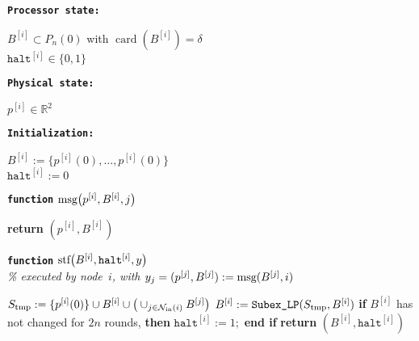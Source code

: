 \documentclass[onecolumn,journal,letterpaper]{IEEEtran}
\newcommand{\real}{{\mathbb{R}}}
\newcommand{\subscr}[2]{{#1}_{\textup{#2}}}
\newcommand{\union}{\cup}
\newcommand{\card}{\ensuremath{\operatorname{card}}}
\newcommand{\subexLP}{\textup{\texttt{SUBEX\_lp}}}
\renewcommand{\subexLP}{\textup{\texttt{Subex\_LP}}}
\newcommand{\innbrs}{\subscr{\mathcal{N}}{in}}
\newcommand{\supind}[2]{{#1}^{[#2]}}
\newcommand{\msg}{\textup{msg}}
\newcommand{\stf}{\textup{stf}}
\begin{document}
\noindent\begin{minipage}{0.44\linewidth}\textbf{\texttt{Processor
      state:}}\end{minipage}\begin{minipage}[t]{0.56\linewidth}
  $\supind{B}{i} \subset P_n(0)$ with $\card(\supind{B}{i})=\delta$\\$\supind{\texttt{halt}}{i}\in\{0,1\}$
\end{minipage}

\noindent\begin{minipage}{0.44\linewidth}\textbf{\texttt{Physical
      state:}}\end{minipage}\begin{minipage}[t]{0.56\linewidth}
  $\supind{p}{i} \in \real^2$
\end{minipage}

\smallskip
\noindent\begin{minipage}{0.44\linewidth}\textbf{\texttt{Initialization:}}\end{minipage}\begin{minipage}[t]{0.56\linewidth}
  $\supind{B}{i} := \{\supind{p}{i}(0),\dots,\supind{p}{i}(0)\}$\\
  $\supind{\texttt{halt}}{i}:=0$
\end{minipage}

\bigskip

\noindent\textbf{\texttt{function}}  $\msg\big(\supind{p}{i},\supind{B}{i},j\big)$ \begin{algorithmic}[1]
  \STATE \textbf{return} $(\supind{p}{i},\supind{B}{i})$
\end{algorithmic}

\medskip

\noindent\textbf{\texttt{function}}  $\stf\big(\supind{B}{i},
\supind{\texttt{halt}}{i}, y\big)$ \\
\emph{\% executed by node~$i$, with $y_j=(\supind{p}{j},\supind{B}{j})
  := \msg(\supind{B}{j},i)$}\\[-1.9em]
\begin{algorithmic}[1]
  \STATE $\subscr{S}{tmp} := \{\supind{p}{i}(0)\} \union \supind{B}{i} \union \big(
  \union_{j\in \innbrs(i)} \supind{B}{j} \big)$
  \STATE $\supind{B}{i} := \subexLP( \subscr{S}{tmp}, \supind{B}{i})$
  \STATE \textbf{if} $\supind{B}{i}$ has not changed for $2n$ rounds,
  \STATE \quad \textbf{then}  $\supind{\texttt{halt}}{i}:=1;$ \quad \textbf{end if}
  \STATE \textbf{return} $(\supind{B}{i}, \supind{\texttt{halt}}{i})$
\end{algorithmic}
\medskip
\end{document}
